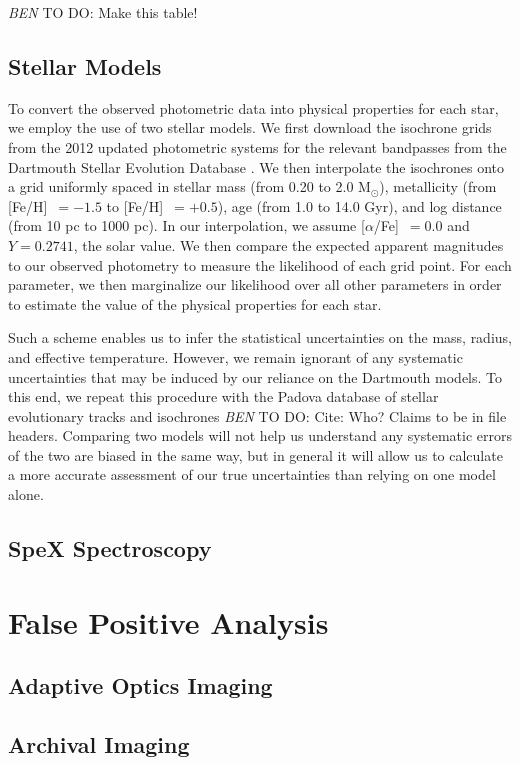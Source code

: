\documentclass{emulateapj}
\newcommand{\msun}{{M$_\odot$}}
\newcommand{\feh}{{[Fe/H]}~}
\newcommand{\afe}{{[$\alpha$/Fe]}~}
\newcommand{\todo}[3]{{\color{#2} \emph{#1} TO DO: #3}}
\newcommand{\btmtodo}[1]{\todo{BEN}{red}{#1}}
\begin{document}
\btmtodo{Make this table!}

\subsection{Stellar Models}
To convert the observed photometric data into physical properties for each
star, we employ the use of two stellar models. 
We first download the isochrone grids from the 2012 updated photometric
systems for the relevant bandpasses from the Dartmouth Stellar Evolution
Database \citep{Dotter08}. 
We then interpolate the isochrones onto a grid uniformly spaced in
stellar mass (from 0.20 to 2.0 \msun), metallicity (from \feh$=-1.5$ to 
\feh$=+0.5$), age (from 1.0 to 14.0 Gyr), and log distance (from 10 pc to 
1000 pc). 
In our interpolation, we assume \afe$=0.0$ and $Y=0.2741$, the solar value.
We then compare the expected apparent magnitudes to our observed photometry
to measure the likelihood of each grid point.
For each parameter, we then marginalize our likelihood over all other 
parameters in order to estimate the value of the physical properties
for each star.

Such a scheme enables us to infer the statistical uncertainties on the
mass, radius, and effective temperature.
However, we remain ignorant of any systematic uncertainties that may be
induced by our reliance on the Dartmouth models.
To this end, we repeat this procedure with the Padova database of stellar
evolutionary tracks and isochrones \btmtodo{Cite: Who? Claims to be in
file headers}. 
Comparing two models will not help us understand any systematic errors
of the two are biased in the same way, but in general it will allow us
to calculate a more accurate assessment of our true uncertainties than 
relying on one model alone.


\subsection{SpeX Spectroscopy}


\section{False Positive Analysis}
\subsection{Adaptive Optics Imaging}

\subsection{Archival Imaging}
\end{document}
